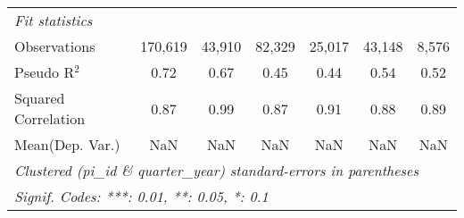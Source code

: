\begin{tabular}{lcccccc}
   \midrule
   \emph{Fit statistics}\\
   Observations                                               & 170,619     & 43,910       & 82,329       & 25,017        & 43,148      & 8,576\\  
   Pseudo R$^2$                                               & 0.72        & 0.67         & 0.45         & 0.44          & 0.54        & 0.52\\  
   Squared Correlation                                        & 0.87        & 0.99         & 0.87         & 0.91          & 0.88        & 0.89\\  
Mean(Dep. Var.) & NaN & NaN & NaN & NaN & NaN & NaN \\
   \midrule \midrule
   \multicolumn{7}{l}{\emph{Clustered (pi\_id \& quarter\_year) standard-errors in parentheses}}\\
   \multicolumn{7}{l}{\emph{Signif. Codes: ***: 0.01, **: 0.05, *: 0.1}}\\
\end{tabular}
\par\endgroup
